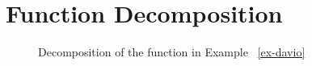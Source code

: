 \pagebreak

\onecolumn

\appendix
\newcommand{\thenewsection}{\Alph{section}}
\renewcommand\thefigure{\thenewsection\arabic{figure}}

\section{Function Decomposition}
\label{App:FuncDecomp}
\begin{figure}[h]
  \centering
  \scalebox{0.8}{}
      \caption{Decomposition of the function in Example ~\ref{ex-bool}}
      \label{app-func-decomp}
  \centering
  \scalebox{0.8}{}
      \caption{Decomposition of the function in Example ~\ref{ex-davio}}
      \label{fig-func-decomp-davio}
\end{figure}

